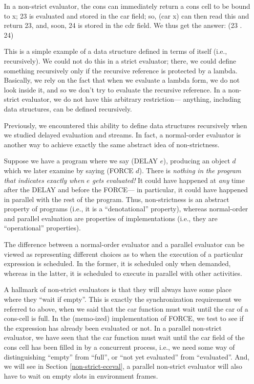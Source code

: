 In a non-strict evaluator, the {\cf cons} can immediately
return a cons cell to be bound to {\cf x}; 23 is evaluated and stored in the
car field; so, {\cf (car x)} can then read this and return 23, and, soon, 24
is stored in the cdr field.  We thus get the answer:
\beginlisp
(23 . 24)
\endlisp

This is a simple example of a data structure defined in terms of itself
(i.e., recursively).  We could not do this in a strict evaluator; there, we
could define something recursively only if the recursive reference is
protected by a {\cf lambda}.  Basically, we rely on the fact that when we
evaluate a {\cf lambda} form, we do not look inside it, and so we don't try
to evaluate the recursive reference.  In a non-strict evaluator, we do not
have this arbitrary restriction--- anything, including data structures, can
be defined recursively.

Previously, we encountered this ability to define data structures
recursively when we studied delayed evaluation and streams.  In fact,
a normal-order evaluator is another way to achieve exactly the same
abstract idea of non-strictness.

Suppose we have a program where we say {\cf (DELAY $e$)}, producing an
object $d$ which we later examine by saying {\cf (FORCE $d$)}.  There
is {\em nothing in the program that indicates exactly when $e$ gets
evaluated!\/} It could have happened at {\em any\/} time after the
{\cf DELAY} and before the {\cf FORCE}--- in particular, it could have
happened in parallel with the rest of the program.  Thus,
non-strictness is an abstract property of programs (i.e., it is a
``denotational'' property), whereas normal-order and parallel
evaluation are properties of implementations (i.e., they are
``operational'' properties).

The difference between a normal-order evaluator and a parallel
evaluator can be viewed as representing different choices as to when
the execution of a particular expression is scheduled.  In the former,
it is scheduled only when demanded, whereas in the latter, it is
scheduled to execute in parallel with other activities.

A hallmark of non-strict evaluators is that they will always have some
place where they ``wait if empty''.  This is exactly the
synchronization requirement we referred to above, when we said that
the {\cf car} function must wait until the car of a cons-cell is full.
In the (memo-ized) implementation of {\cf FORCE}, we test to see if
the expression has already been evaluated or not.  In a parallel
non-strict evaluator, we have seen that the {\cf car} function must
wait until the car field of the cons cell has been filled in by a
concurrent process, i.e., we need some way of distinguishing ``empty''
from ``full'', or ``not yet evaluated'' from ``evaluated''.  And, we
will see in Section \ref{non-strict-eceval}, a parallel non-strict
evaluator will also have to wait on empty slots in environment frames.

